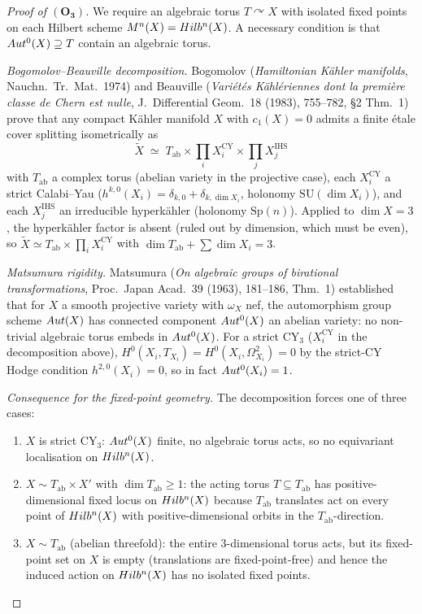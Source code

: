 \begin{proof}[Proof of $(\mathbf{O_3})$]
We require an algebraic torus $T \curvearrowright X$ with isolated
fixed points on each Hilbert scheme $M^n(X) = Hilb^n(X)$. A necessary
condition is that $Aut^0(X) \supseteq T$ contain an algebraic torus.

\emph{Bogomolov--Beauville decomposition.}
Bogomolov (\emph{Hamiltonian Kähler manifolds}, Nauchn.\ Tr.\ Mat.\
1974) and Beauville (\emph{Variétés Kählériennes dont la première
classe de Chern est nulle}, J.\ Differential Geom.\ 18 (1983), 755--782,
\S2 Thm.~1) prove that any compact Kähler manifold $X$ with $c_1(X) =
0$ admits a finite étale cover splitting isometrically as
\[
  \widetilde X \;\simeq\; T_\mathrm{ab} \times \prod_i X_i^{\mathrm{CY}}
  \times \prod_j X_j^{\mathrm{IHS}}
\]
with $T_\mathrm{ab}$ a complex torus (abelian variety in the projective
case), each $X_i^{\mathrm{CY}}$ a strict Calabi--Yau ($h^{k,0}(X_i)
= \delta_{k,0} + \delta_{k,\dim X_i}$, holonomy
$\mathrm{SU}(\dim X_i)$), and each $X_j^{\mathrm{IHS}}$ an
irreducible hyperkähler (holonomy $\mathrm{Sp}(n)$). Applied to
$\dim X = 3$, the hyperkähler factor is absent (ruled out by dimension,
which must be even), so $\widetilde X \simeq T_\mathrm{ab} \times
\prod_i X_i^{\mathrm{CY}}$ with $\dim T_\mathrm{ab} + \sum\dim X_i = 3$.

\emph{Matsumura rigidity.}
Matsumura (\emph{On algebraic groups of birational transformations},
Proc.\ Japan Acad.\ 39 (1963), 181--186, Thm.~1) established that for
$X$ a smooth projective variety with $\omega_X$ nef, the automorphism
group scheme $Aut(X)$ has connected component $Aut^0(X)$ an abelian
variety: no non-trivial algebraic torus embeds in $Aut^0(X)$. For a
strict CY$_3$ ($X_i^{\mathrm{CY}}$ in the decomposition above),
$H^0(X_i, T_{X_i}) = H^0(X_i, \Omega_{X_i}^2) = 0$ by the strict-CY
Hodge condition $h^{2,0}(X_i) = 0$, so in fact $Aut^0(X_i) = 1$.

\emph{Consequence for the fixed-point geometry.}
The decomposition forces one of three cases:
\begin{enumerate}[leftmargin=2em]
\item $X$ is strict CY$_3$: $Aut^0(X)$ finite, no algebraic torus
  acts, so no equivariant localisation on $Hilb^n(X)$.
\item $X \sim T_\mathrm{ab} \times X'$ with $\dim T_\mathrm{ab} \geq 1$:
  the acting torus $T \subseteq T_\mathrm{ab}$ has positive-dimensional
  fixed locus on $Hilb^n(X)$ because $T_\mathrm{ab}$ translates act on
  every point of $Hilb^n(X)$ with positive-dimensional orbits in the
  $T_\mathrm{ab}$-direction.
\item $X \sim T_\mathrm{ab}$ (abelian threefold): the entire
  $3$-dimensional torus acts, but its fixed-point set on $X$ is empty
  (translations are fixed-point-free) and hence the induced action on
  $Hilb^n(X)$ has no isolated fixed points.
\end{enumerate}


\end{proof}
